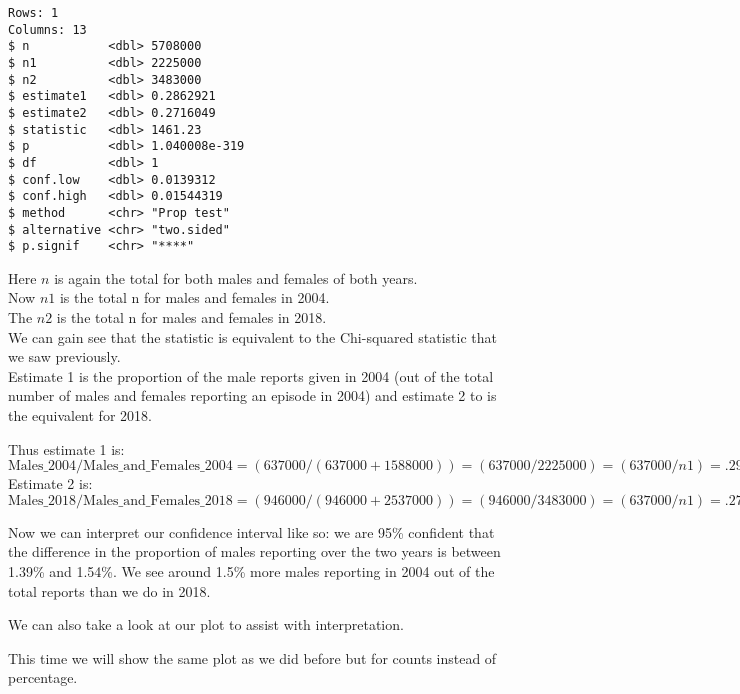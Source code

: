 \documentclass[
]{article}
\newenvironment{Shaded}{\begin{snugshade}}{\end{snugshade}}
\newcommand{\DataTypeTok}[1]{\textcolor[rgb]{0.13,0.29,0.53}{#1}}
\newcommand{\FloatTok}[1]{\textcolor[rgb]{0.00,0.00,0.81}{#1}}
\newcommand{\KeywordTok}[1]{\textcolor[rgb]{0.13,0.29,0.53}{\textbf{#1}}}
\newcommand{\NormalTok}[1]{#1}
\newcommand{\OperatorTok}[1]{\textcolor[rgb]{0.81,0.36,0.00}{\textbf{#1}}}
\newcommand{\OtherTok}[1]{\textcolor[rgb]{0.56,0.35,0.01}{#1}}
\newcommand{\StringTok}[1]{\textcolor[rgb]{0.31,0.60,0.02}{#1}}
\begin{document}
\begin{Shaded}
\end{Shaded}

\begin{verbatim}
Rows: 1
Columns: 13
$ n           <dbl> 5708000
$ n1          <dbl> 2225000
$ n2          <dbl> 3483000
$ estimate1   <dbl> 0.2862921
$ estimate2   <dbl> 0.2716049
$ statistic   <dbl> 1461.23
$ p           <dbl> 1.040008e-319
$ df          <dbl> 1
$ conf.low    <dbl> 0.0139312
$ conf.high   <dbl> 0.01544319
$ method      <chr> "Prop test"
$ alternative <chr> "two.sided"
$ p.signif    <chr> "****"
\end{verbatim}

Here \(n\) is again the total for both males and females of both
years.\\
Now \(n1\) is the total n for males and females in 2004.\\
The \(n2\) is the total n for males and females in 2018.\\
We can gain see that the statistic is equivalent to the Chi-squared
statistic that we saw previously.\\
Estimate 1 is the proportion of the male reports given in 2004 (out of
the total number of males and females reporting an episode in 2004) and
estimate 2 to is the equivalent for 2018.

Thus estimate 1 is:
\[\text{Males_2004/Males_and_Females_2004} = (637000/(637000 + 1588000)) = (637000/2225000) = (637000/n1) = .29\]
Estimate 2 is:
\[\text{Males_2018/Males_and_Females_2018} = (946000/(946000 + 2537000)) = (946000/3483000) = (637000/n1) = .27\]

Now we can interpret our confidence interval like so: we are 95\%
confident that the difference in the proportion of males reporting over
the two years is between 1.39\% and 1.54\%. We see around 1.5\% more
males reporting in 2004 out of the total reports than we do in 2018.

We can also take a look at our plot to assist with interpretation.

This time we will show the same plot as we did before but for counts
instead of percentage.
\end{document}
